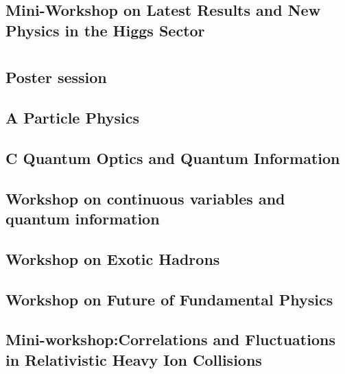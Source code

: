 \subsection{Mini-Workshop on Latest Results and New Physics in the Higgs Sector}

\clearpage

\section{}
\subsection{Poster session}

\clearpage

\subsection{A Particle Physics}

\clearpage

\subsection{C Quantum Optics and Quantum Information}

\clearpage

\subsection{Workshop on continuous variables and quantum information}

\clearpage

\subsection{Workshop on Exotic Hadrons}

\clearpage

\subsection{Workshop on Future of Fundamental Physics}

\clearpage

\subsection{Mini-workshop:Correlations and Fluctuations in Relativistic Heavy Ion Collisions}

\clearpage

\section{}
